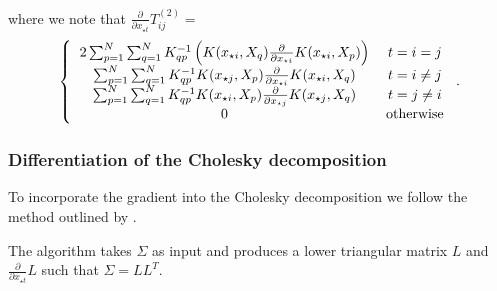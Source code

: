 \documentclass[index]{subfiles}
\begin{document}
where we note that $\frac{\partial}{\partial x_{\star t}} T^{(2)}_{ij} = $
\begin{equation}
    \left\{ \begin{tabular}{cc}
        $2 \sum_{p = 1}^{N} \sum_{q = 1}^{N} K^{-1}_{qp} \left( K(x_{\star i}, X_{q}) \frac{\partial}{\partial x_{\star i}} K(x_{\star i}, X_{p}) \right)$ & $t = i = j$ \\
        $\sum_{p = 1}^{N} \sum_{q = 1}^{N} K^{-1}_{qp} K(x_{\star j}, X_{p}) \frac{\partial}{\partial x_{\star i}} K(x_{\star i}, X_{q})$ & $t = i \neq j$ \\
							$\sum_{p = 1}^{N} \sum_{q = 1}^{N} K^{-1}_{qp} K(x_{\star i}, X_{p}) \frac{\partial}{\partial x_{\star j}} K(x_{\star j}, X_{q})$ & $t = j \neq i$ \\
							$0$ & otherwise
                                                      \end{tabular} \right..
\end{equation}

\subsubsection{Differentiation of the Cholesky decomposition}

To incorporate the gradient into the Cholesky decomposition we follow the method outlined by \cite{Smith1995}.

The algorithm takes $\Sigma$ as input and produces a lower triangular matrix $L$ and $\frac{\partial}{\partial x_{\star t}} L$ such that $\Sigma = LL^{T}$.
\end{document}
